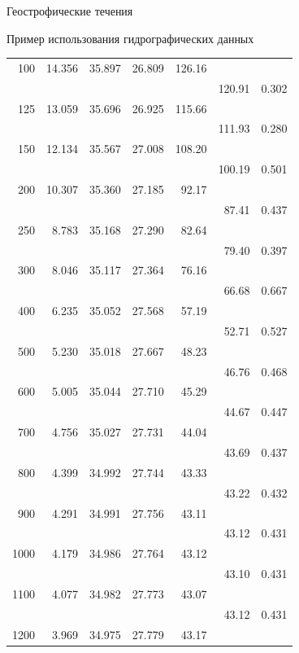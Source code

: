 \begin{chapter}{Геострофические течения}
\begin{section}{Пример использования гидрографических данных}
\begin{table}[t!]
\begin{small}
\begin{center}
\begin{tabular}{rrrrrrl}
100&    14.356& 35.897& 26.809& 126.16&\\
 &            &       &       &       &     120.91& 0.302\\
125&    13.059& 35.696& 26.925& 115.66&\\
 &            &       &       &       &     111.93& 0.280\\
150&    12.134& 35.567& 27.008& 108.20&\\
 &            &       &       &       &     100.19& 0.501\\
200&    10.307& 35.360& 27.185& 92.17&\\
 &            &       &       &       &     87.41&  0.437\\
250&    8.783&  35.168& 27.290& 82.64&\\
 &            &       &       &       &     79.40&  0.397\\
300&    8.046&  35.117& 27.364& 76.16&\\
 &            &       &       &       &     66.68&  0.667\\
400&    6.235&  35.052& 27.568& 57.19&\\
 &            &       &       &       &     52.71&  0.527\\
500&    5.230&  35.018& 27.667& 48.23&\\
 &            &       &       &       &     46.76&  0.468\\
600&    5.005&  35.044& 27.710& 45.29&\\
 &            &       &       &       &     44.67&  0.447\\
700&    4.756&  35.027& 27.731& 44.04&\\
 &            &       &       &       &     43.69&  0.437\\
800&    4.399&  34.992& 27.744& 43.33&\\
 &            &       &       &       &     43.22&  0.432\\
900&    4.291&  34.991& 27.756& 43.11&\\
 &            &       &       &       &     43.12&  0.431\\
1000&   4.179&  34.986& 27.764& 43.12&\\
 &            &       &       &       &     43.10&  0.431\\
1100&   4.077&  34.982& 27.773& 43.07&\\
 &            &       &       &       &     43.12&  0.431\\
1200&   3.969&  34.975& 27.779& 43.17&\\

\end{tabular}
\end{center}
\end{small}
\end{table}
\end{section}
\end{chapter}

